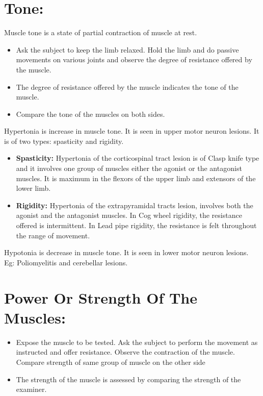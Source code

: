 \documentclass[a4paper,12pt,openany,oneside]{book}
\begin{document}
\section*{Tone:}
	Muscle tone is a state of partial contraction of muscle at rest.
	\begin{itemize}
\item{Ask the subject to keep the limb relaxed. Hold the limb and do passive movements on various joints and observe the degree of resistance offered by the muscle.}
\item{The degree of resistance offered by the muscle indicates the tone of the muscle.}
\item{Compare the tone of the muscles on both sides.}
	\end{itemize}
	\par
	Hypertonia is increase in muscle tone. It is seen in upper motor neuron lesions. It is of two types: spasticity and rigidity.
	\begin{itemize}
		\item{\textbf{Spasticity:} Hypertonia of the corticospinal tract lesion is of Clasp knife type and it involves one group of muscles either the agonist or the antagonist muscles. It is maximum in the flexors of the upper limb and extensors of the lower limb.}
		\item{\textbf{Rigidity:} Hypertonia of the extrapyramidal tracts lesion, involves both the agonist and the antagonist muscles. In Cog wheel rigidity, the resistance offered is intermittent. In Lead pipe rigidity, the resistance is felt throughout the range of movement.}
	\end{itemize}
	Hypotonia is decrease in muscle tone. It is seen in lower motor neuron lesions. Eg: Poliomyelitis and cerebellar lesions.
	\section*{Power Or Strength Of The Muscles:}
	\begin{itemize}
\item{Expose the muscle to be tested. Ask the subject to perform the movement as instructed and offer resistance. Observe the contraction of the muscle. Compare strength of same group of muscle on the other side}
\item{The strength of the muscle is assessed by comparing the  strength of the examiner.}
	\end{itemize}
\end{document}
